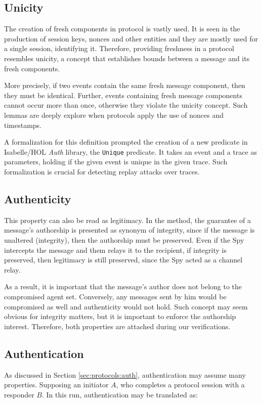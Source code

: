 \subsection{Unicity}
The creation of fresh components in protocol is vastly used. It is seen in the production of session keys, nonces and other entities and they are mostly used for a single session, identifying it. Therefore, providing freshness in a protocol resembles unicity, a concept that establishes bounds between a message and its fresh components.

More precisely, if two events contain the same fresh message component, then they must be identical. Further, events containing fresh message components cannot occur more than once, otherwise they violate the unicity concept. Such lemmas are deeply explore when protocols apply the use of nonces and timestamps.

A formalization for this definition prompted the creation of a new predicate in Isabelle/HOL \textit{Auth} library, the \texttt{Unique} predicate. It takes an event and a trace as parameters, holding if the given event is unique in the given trace. Such formalization is crucial for detecting replay attacks over traces.



\subsection{Authenticity}
This property can also be read as legitimacy. In the method, the guarantee of a message's authorship is presented as synonym of integrity, since if the message is unaltered (integrity), then the authorship must be preserved. Even if the Spy intercepts the message and them relays it to the recipient, if integrity is preserved, then legitimacy is still preserved, since the Spy acted as a channel relay.

As a result, it is important that the message's author does not belong to the compromised agent set. Conversely, any messages sent by him would be compromised as well and authenticity would not hold. Such concept may seem obvious for integrity matters, but it is important to enforce the authorship interest. Therefore, both properties are attached during our verifications.



\subsection{Authentication}
As discussed in Section \ref{sec:protocols:auth}, authentication may assume many properties. Supposing an initiator $A$, who completes a protocol session with a responder $B$. In this run, authentication may be translated as:

